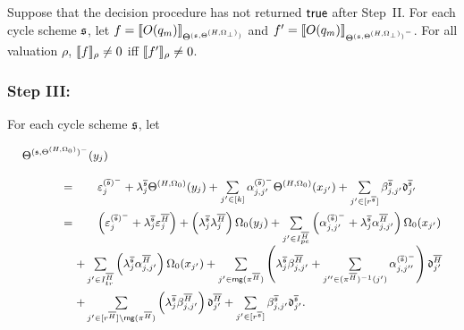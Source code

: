 \begin{lemma}\label{prop-bnd-domain-1}
	Suppose that the decision procedure has not returned $\mathsf{true}$ after Step~II. For each cycle scheme ${\mathfrak{s} }$, let $f=\llbracket O(q_m)\rrbracket_{\Theta^{({\mathfrak{s} }, \Theta^{(H,\Omega_\bot)})}}$ and $f'=\llbracket O(q_m)\rrbracket_{{\Theta^{({\mathfrak{s} }, \Theta^{(H,\Omega_\bot)})}}^-}$. For all valuation $\rho$, $\llbracket f\rrbracket_{\rho}\neq 0$ iff $\llbracket f'\rrbracket_{\rho} \neq 0$.
\end{lemma}



\subsubsection{Step III:} 

For each cycle scheme ${\mathfrak{s} }$, let
%
\[
\small
\def\arraystretch{2}
\begin{array}{r l l}
\smallskip
\sumf^{(\schm,\sumf^{(H,\initval_0)})^-}(y_j)  & & \\
 & \hspace{-16mm} = & \hspace{-10mm}  \cste^{(\circled{\schm})^-}_{j} + \cstl^{\circled{\schm}}_j \sumf^{(H,\initval_0)}(y_j)  + \sum \limits_{j' \in [k]}  \csta^{(\circled{\schm})^-}_{j,j'}  \sumf^{(H,\initval_0)}(x_{j'}) + \sum \limits_{j' \in [r^{\circled{\schm}}]} \cstb^{\circled{\schm}}_{j,j'} \vard^{\circled{\schm}}_{j'}  \\
	& \hspace{-16mm} = & \hspace{-10mm}  
	\left( \cste^{(\circled{\schm})^-}_{j}+ \cstl^{\circled{\schm}}_{j} \cste^{\circled{H}}_{j}\right)+ \left(\cstl^{\circled{\schm}}_{j} \cstl^{\circled{H}}_{j} \right) \initval_0(y_j)+  \sum \limits_{j' \in I^{\circled{H}}_{pe}} 
	\left(\csta^{(\circled{\schm})^-}_{j,j'} +\cstl^{\circled{\schm}}_{j} \csta^{\circled{H}}_{j,j'}\right) \initval_0(x_{j'}) \\
	& &   \hspace{-16mm} + \sum \limits_{j' \in  I^{\circled{H}}_{tr}} 
	\left(\cstl^{\circled{\schm}}_{j} \csta^{\circled{H}}_{j,j'} \right) \initval_0(x_{j'}) + 	\sum \limits_{j' \in \rng(\pi^{\circled{H}})} \left(\cstl^{\circled{\schm}}_{j} \cstb^{\circled{H}}_{j,j'}+  \sum \limits_{j'' \in (\pi^{\circled{H}})^{-1}(j')} \csta^{(\circled{\schm})^-}_{j,j''} \right) \vard^{\circled{H}}_{j'} \\
	& & 
\hspace{-16mm} +  \sum \limits_{j' \in [r^{\circled{H}}]\setminus \rng(\pi^{\circled{H}})} \left( \cstl^{\circled{\schm}}_{j} \cstb^{\circled{H}}_{j,j'} \right) \vard^{\circled{H}}_{j'} +
	\sum \limits_{j'\in[r^{\circled{\schm}}]} \cstb^{\circled{\schm}}_{j,j'} \vard^{\circled{\schm}}_{j'}.
	\end{array}
\]
 
